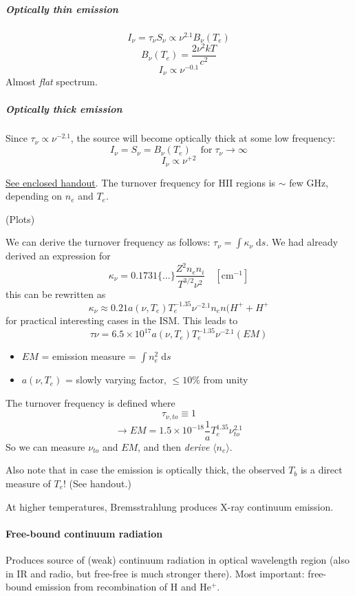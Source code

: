 \documentclass[11pt]{article}
\newcommand{\mar}[1]{\hspace{0pt}\marginpar{-\textcolor{black}{#1}-}}
\begin{document}
\subparagraph{Optically thin emission}
\[
    I_{\nu} = \tau_{\nu} S_{\nu} \propto \nu^{2.1} B_{\nu}(T_{e})
    \]
\[
    B_{\nu}(T_{e}) = \frac{2\nu^{2}kT}{c^{2}}
    \]
\[
    \boxed{ I_{\nu} \propto \nu^{-0.1} }
\]
Almost \emph{flat} spectrum.

\subparagraph{Optically thick emission}
Since $\tau_{\nu} \propto \nu^{-2.1}$, the source will become optically
thick at some low frequency:
\[
    I_{\nu} = S_{\nu} = B_{\nu}(T_{e}) \quad
    \mathrm{for}\; \tau_{\nu} \rightarrow \infty
    \]
\[
    \boxed{ I_{\nu} \propto \nu^{+2} }
    \]

\underline{See enclosed handout}. The turnover frequency for HII regions is
$\sim$ few GHz, depending on $n_{e}$ and $T_{e}$.

\mar{66}(Plots)

\mar{67}We can derive the turnover frequency as follows:
$\tau_{\nu} = \int{\kappa_{\nu}\;\mathrm{d}s}$.
We had already derived an expression for
\[
    \kappa_{\nu} = 0.1731 \{\ldots\} \frac{Z^{2}n_{e}n_{i}}{T^{3/2}\nu^{2}}
    \quad [\mathrm{cm}^{-1}]
    \]
this can be rewritten as
\[
    \kappa_{\nu} \approx 0.21 a(\nu,T_{e}) T_{e}^{-1.35} \nu^{-2.1}
    n_{e}n(H^{+}+H^{+}
    \]
for practical interesting cases in the ISM. This leads to
\[
    \tau{\nu} = 6.5 \times 10^{17} a(\nu,T_{e}) T_{e}^{-1.35} \nu^{-2.1} (EM)
    \]
\begin{itemize}
    \item $EM$ = emission measure = $\int{ n_{e}^{2} \;\mathrm{d}s }$
    \item $a(\nu,T_{e})$ = slowly varying factor, $\leq 10\%$ from unity
\end{itemize}
The turnover frequency is defined where
\[
    \tau_{\nu,to} \equiv 1
    \]
\[
    \rightarrow EM = 1.5 \times 10^{-18} \frac{1}{a} T_{e}^{1.35} \nu_{to}^{2.1}
    \]
So we can measure $\nu_{to}$ and $EM$, and then \emph{derive}
$\langle n_{e} \rangle$.

Also note that in case the emission is optically thick, the observed $T_{b}$
is a direct measure of $T_{e}$! (See handout.)

At higher temperatures, Bremsstrahlung produces X-ray continuum emission.

\paragraph{Free-bound continuum radiation}
\mar{68}Produces source of (weak) continuum radiation in optical wavelength
region (also in IR and radio, but free-free is much stronger there).
Most important: free-bound emission from recombination of H and He$^{+}$.
\end{document}
